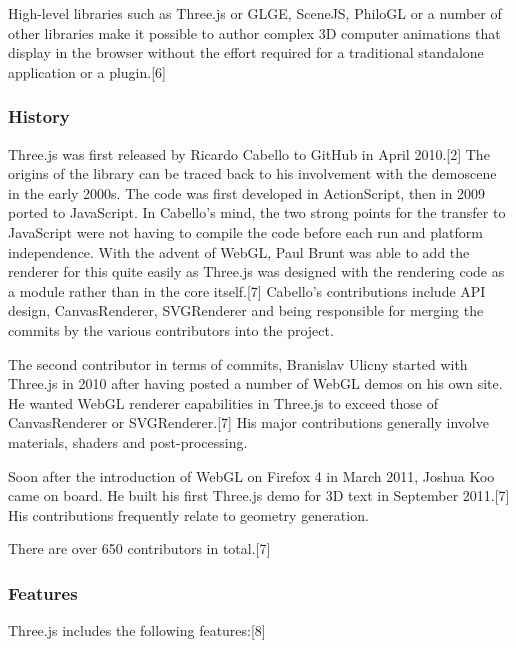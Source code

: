High-level libraries such as Three.js or GLGE, SceneJS, PhiloGL or a number of other libraries make it possible to author complex 3D computer animations that display in the browser without the effort required for a traditional standalone application or a plugin.[6]

\subsubsection{History}
Three.js was first released by Ricardo Cabello to GitHub in April 2010.[2] The origins of the library can be traced back to his involvement with the demoscene in the early 2000s. The code was first developed in ActionScript, then in 2009 ported to JavaScript. In Cabello's mind, the two strong points for the transfer to JavaScript were not having to compile the code before each run and platform independence. With the advent of WebGL, Paul Brunt was able to add the renderer for this quite easily as Three.js was designed with the rendering code as a module rather than in the core itself.[7] Cabello's contributions include API design, CanvasRenderer, SVGRenderer and being responsible for merging the commits by the various contributors into the project.

The second contributor in terms of commits, Branislav Ulicny started with Three.js in 2010 after having posted a number of WebGL demos on his own site. He wanted WebGL renderer capabilities in Three.js to exceed those of CanvasRenderer or SVGRenderer.[7] His major contributions generally involve materials, shaders and post-processing.

Soon after the introduction of WebGL on Firefox 4 in March 2011, Joshua Koo came on board. He built his first Three.js demo for 3D text in September 2011.[7] His contributions frequently relate to geometry generation.

There are over 650 contributors in total.[7]

\subsubsection{Features}
Three.js includes the following features:[8]

